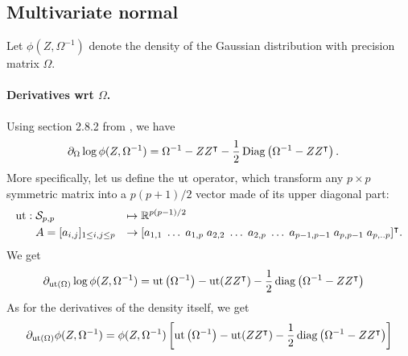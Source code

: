 \subsection{Multivariate normal} \label{app:multinorm}

Let $\phi(Z, \Omega^{-1})$ denote the density of the Gaussian distribution with precision matrix $\Omega$.

\paragraph{Derivatives wrt $\Omega$.}
Using section 2.8.2 from \cite{PeP12}, we have
\begin{align*}
  \partial_\Omega \log \phi(Z, \Omega^{-1}) 
  & = \Omega^{-1} - Z Z^\intercal - \frac12 \operatorname{Diag}\left(\Omega^{-1} - Z Z^\intercal \right).
\end{align*}
More specifically, let us define the $\operatorname{ut}$ operator, which transform any $p \times p$ symmetric matrix into a $p(p+1)/2$ vector made of its upper diagonal part:
$$
\begin{aligned} 
  \operatorname{ut}: & \; \mathcal{S}_{p, p} & \mapsto & \; \mathbb{R}^{p(p-1)/2} \\
 & \; A = [a_{i, j}]_{1 \leq i, j \leq p}
 & \rightarrow 
 & \; [a_{1,1} \; \dots \; a_{1,p} \; a_{2,2} \; \dots \; a_{2,p} \; \dots \; a_{p-1, p-1} \; a_{p, p-1} \;  a_{p,..p}]^\intercal.
\end{aligned}
$$
We get
\begin{align*}
  \partial_{\operatorname{ut}(\Omega)} \log \phi(Z, \Omega^{-1}) 
  & = \operatorname{ut}\left(\Omega^{-1}\right) - \operatorname{ut}(Z Z^\intercal) - \frac12 \operatorname{diag}\left(\Omega^{-1} - Z Z^\intercal \right)
\end{align*}
As for the derivatives of the density itself, we get
\begin{align*}
  \partial_{\operatorname{ut}(\Omega)} \phi(Z, \Omega^{-1}) 
  & = \phi(Z, \Omega^{-1}) \left[\operatorname{ut}\left(\Omega^{-1}\right) - \operatorname{ut}(Z Z^\intercal) - \frac12 \operatorname{diag}\left(\Omega^{-1} - Z Z^\intercal \right) \right] \\
\end{align*}


